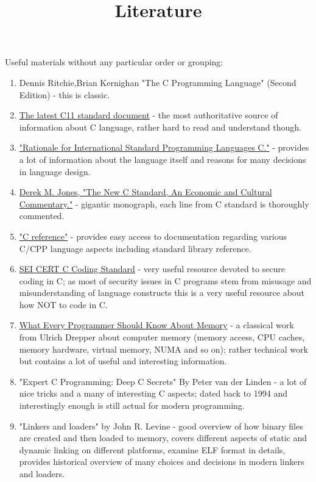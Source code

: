 \documentclass{article}
\begin{document}
\title{Literature}
{\Large Useful materials without any particular order or grouping:}
\begin{enumerate}
\item Dennis Ritchie,Brian Kernighan "The C Programming Language" (Second Edition) - this is classic.
\item \href{http://www.open-std.org/jtc1/sc22/wg14/www/docs/n1548.pdf}{The latest C11 standard document} - the most authoritative source of information about C language, rather hard to read and understand though.
\item \href{http://www.open-std.org/jtc1/sc22/wg14/www/C99RationaleV5.10.pdf}{"Rationale for International Standard Programming Languages C."} - provides a lot of information about the language itself and reasons for many decisions in language design.
\item \href{http://people.ece.cornell.edu/land/courses/ece4760/cbook1_1.pdf}{Derek M. Jones, "The New C Standard, An Economic and Cultural Commentary."} - gigantic monograph, each line from C standard is thoroughly commented.
\item \href{http://en.cppreference.com/w/c}{"C reference"} - provides easy access to documentation regarding various C/CPP language aspects including standard library reference.
\item \href{https://www.securecoding.cert.org/confluence/display/c/SEI+CERT+C+Coding+Standard}{SEI CERT C Coding Standard} - very useful resource devoted to secure coding in C; as most of security issues in C programs stem from misusage and misunderstanding of language constructs this is a very useful resource about how NOT to code in C.
\item \href{https://www.akkadia.org/drepper/cpumemory.pdf}{What Every Programmer Should Know About Memory} - a classical work from Ulrich Drepper about computer memory (memory access, CPU caches, memory hardware, virtual memory, NUMA and so on); rather technical work but contains a lot of useful and interesting information.
\item "Expert C Programming: Deep C Secrets" By Peter van der Linden - a lot of nice tricks and a many of interesting C aspects; dated back to 1994 and interestingly enough is still actual for modern programming.
\item "Linkers and loaders" by John R. Levine - good overview of how binary files are created and then loaded to memory, covers different aspects of static and dynamic linking on different platforms, examine ELF format in details, provides historical overview of many choices and decisions in modern linkers and loaders.

\end{enumerate}
\end{document}

